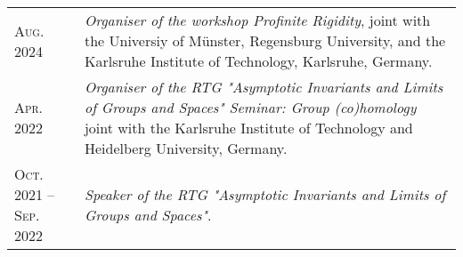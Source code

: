 \documentclass[a4paper,11pt]{article} %
\begin{document}
\begin{longtable}{>{\raggedleft\arraybackslash}p{4.2cm}p{10cm}}

    \textsc{Aug. 2024} & \emph{Organiser of the workshop Profinite Rigidity}, joint with the Universiy of Münster, Regensburg University, and the Karlsruhe Institute of Technology, Karlsruhe, Germany.\\

    \textsc{Apr. 2022} & \emph{Organiser of the RTG "Asymptotic Invariants and Limits of Groups and Spaces"
    Seminar: Group (co)homology} joint with the Karlsruhe Institute of Technology and Heidelberg University, Germany.\\

    \textsc{Oct. 2021 -- Sep. 2022} & \emph{Speaker of the RTG "Asymptotic Invariants and Limits of Groups and Spaces"}.\\

\end{longtable}


%
%
%
\end{document}
